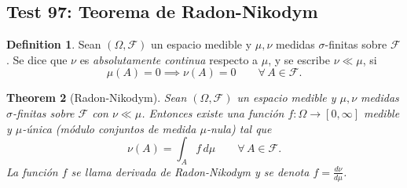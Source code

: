 \documentclass[11pt,a4paper]{article}
\theoremstyle{plain}
\newtheorem{theorem}{Theorem}[section]
\theoremstyle{definition}
\newtheorem{definition}[theorem]{Definition}
\begin{document}
\subsection*{Test 97: Teorema de Radon-Nikodym}

\begin{definition}
Sean $(\Omega,\mathcal{F})$ un espacio medible y $\mu,\nu$ medidas $\sigma$-finitas sobre $\mathcal{F}$. Se dice que $\nu$ es \emph{absolutamente continua} respecto a $\mu$, y se escribe $\nu\ll\mu$, si
\[
\mu(A)=0\implies\nu(A)=0\qquad\forall\,A\in\mathcal{F}.
\]
\end{definition}

\begin{theorem}[Radon-Nikodym]
Sean $(\Omega,\mathcal{F})$ un espacio medible y $\mu,\nu$ medidas $\sigma$-finitas sobre $\mathcal{F}$ con $\nu\ll\mu$. Entonces existe una función $f:\Omega\to[0,\infty]$ medible y $\mu$-única (módulo conjuntos de medida $\mu$-nula) tal que
\[
\nu(A)=\int_{A}f\,d\mu\qquad\forall\,A\in\mathcal{F}.
\]
La función $f$ se llama \emph{derivada de Radon-Nikodym} y se denota $f=\frac{d\nu}{d\mu}$.
\end{theorem}
\end{document}
